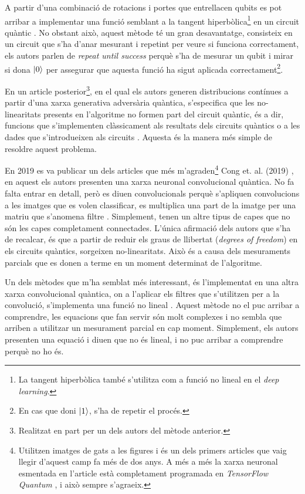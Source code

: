 A partir d'una combinació de rotacions i portes que entrellacen qubits es pot arribar a implementar una funció semblant a la tangent hiperbòlica\footnote{La tangent hiperbòlica també s'utilitza com a funció no lineal en el \textit{deep learning}.} en un circuit quàntic \cite{cao2017quantum}. No obstant això, aquest mètode té un gran desavantatge, consisteix en un circuit que s'ha d'anar mesurant i repetint per veure si funciona correctament, els autors parlen de \textit{repeat until success} perquè s'ha de mesurar un qubit i mirar si dona $\ket{0}$ per assegurar que aquesta funció ha sigut aplicada correctament\footnote{En cas que doni $\ket{1}$, s'ha de repetir el procés.}.

En un article posterior\footnote{Realitzat en part per un dels autors del mètode anterior.}, en el qual els autors generen distribucions contínues a partir d'una xarxa generativa adversària quàntica, s'especifica que les no-linearitats presents en l'algoritme no formen part del circuit quàntic, és a dir, funcions que s'implementen clàssicament als resultats dels circuits quàntics o a les dades que s'introdueixen als circuits \cite{romero2019variational}. Aquesta és la manera més simple de resoldre aquest problema. 

En 2019 es va publicar un dels articles que més m'agraden\footnote{Utilitzen imatges de gats a les figures i és un dels primers articles que vaig llegir d'aquest camp fa més de dos anys. A més a més la xarxa neuronal esmentada en l'article està completament programada en \textit{TensorFlow Quantum} \cite{tfq}, i això sempre s'agraeix. } Cong et. al. (2019) \cite{cong2019convolucional}, en aquest els autors presenten una xarxa neuronal convolucional quàntica. No fa falta entrar en detall, però es diuen convolucionals perquè s'apliquen convolucions a les imatges que es volen classificar, es multiplica una part de la imatge per una matriu que s'anomena filtre \cite{CNN}. Simplement, tenen un altre tipus de capes que no són les capes completament connectades. L'única afirmació dels autors que s'ha de recalcar, és que a partir de reduir els graus de llibertat (\textit{degrees of freedom}) en els circuits quàntics, sorgeixen no-linearitats. Això és a causa dels mesuraments parcials que es donen a terme en un moment determinat de l'algoritme.

Un dels mètodes que m'ha semblat més interessant, és l'implementat en una altra xarxa convolucional quàntica, on a l'aplicar els filtres que s'utilitzen per a la convolució, s'implementa una funció no lineal \cite{liu_QCNN}. Aquest mètode no el puc arribar a comprendre, les equacions que fan servir són molt complexes i no sembla que arriben a utilitzar un mesurament parcial en cap moment. Simplement, els autors presenten una equació i diuen que no és lineal, i no puc arribar a comprendre perquè no ho és.

